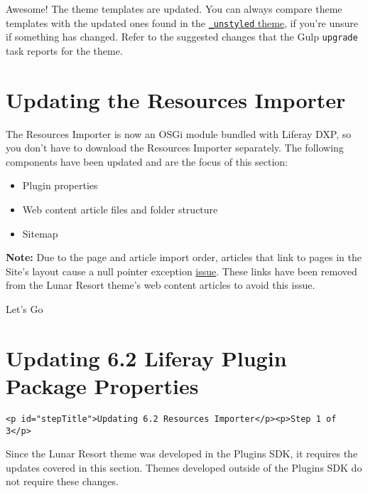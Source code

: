 Awesome! The theme templates are updated. You can always compare theme
templates with the updated ones found in the
\href{https://github.com/liferay/liferay-portal/tree/7.2.x/modules/apps/frontend-theme/frontend-theme-unstyled/src/main/resources/META-INF/resources/_unstyled/templates}{\texttt{\_unstyled}
theme}, if you're unsure if something has changed. Refer to the
suggested changes that the Gulp \texttt{upgrade} task reports for the
theme.

\chapter{Updating the Resources
Importer}\label{updating-the-resources-importer}

The Resources Importer is now an OSGi module bundled with Liferay DXP,
so you don't have to download the Resources Importer separately. The
following components have been updated and are the focus of this
section:

\begin{itemize}
\tightlist
\item
  Plugin properties
\item
  Web content article files and folder structure
\item
  Sitemap
\end{itemize}

\noindent\hrulefill

\textbf{Note:} Due to the page and article import order, articles that
link to pages in the Site's layout cause a null pointer exception
\href{https://issues.liferay.com/browse/LPS-64859}{issue}. These links
have been removed from the Lunar Resort theme's web content articles to
avoid this issue.

\noindent\hrulefill

Let's Go{}

\chapter{Updating 6.2 Liferay Plugin Package
Properties}\label{updating-6.2-liferay-plugin-package-properties}

\begin{verbatim}
<p id="stepTitle">Updating 6.2 Resources Importer</p><p>Step 1 of 3</p>
\end{verbatim}

Since the Lunar Resort theme was developed in the Plugins SDK, it
requires the updates covered in this section. Themes developed outside
of the Plugins SDK do not require these changes.

